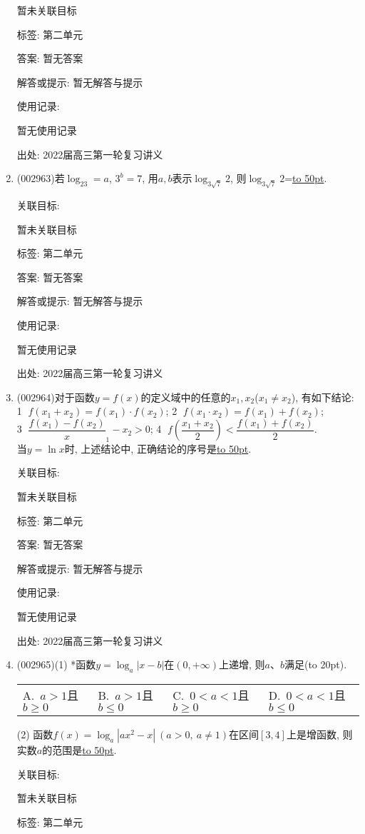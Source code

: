 \documentclass[10pt,a4paper]{article}
\newcommand{\blank}[1]{\underline{\hbox to #1pt{}}}
\newcommand{\bracket}[1]{(\hbox to #1pt{})}
\newcommand{\fourch}[4]{\par\begin{tabular}{p{.23\textwidth}p{.23\textwidth}p{.23\textwidth}p{.23\textwidth}}
A.~#1 &B.~#2& C.~#3& D.~#4
\end{tabular}}
\begin{document}
\begin{enumerate}[1.]
暂未关联目标



标签: 第二单元

答案: 暂无答案

解答或提示: 暂无解答与提示

使用记录:

暂无使用记录


出处: 2022届高三第一轮复习讲义
\item { (002963)}若$\log_23=a$, $3^b=7$, 用$a,b$表示$\log_{3\sqrt 7}2$, 则$\log_{3\sqrt 7}2$=\blank{50}.


关联目标:

暂未关联目标



标签: 第二单元

答案: 暂无答案

解答或提示: 暂无解答与提示

使用记录:

暂无使用记录


出处: 2022届高三第一轮复习讲义
\item { (002964)}对于函数$y=f(x)$的定义域中的任意的$x_1,x_2$($x_1\ne x_2$), 有如下结论:\\
\textcircled{1} $f(x_1+x_2)=f(x_1)\cdot f(x_2)$; \textcircled{2} $f(x_1\cdot x_2)=f(x_1)+f(x_2)$;\\ \textcircled{3} $\dfrac{f(x_1)-f(x_2)}x_1-x_2>0$; \textcircled{4} $f(\dfrac{x_1+x_2}2)<\dfrac{f(x_1)+f(x_2)}2$. 
\\当$y=\ln x$时, 上述结论中, 正确结论的序号是\blank{50}.


关联目标:

暂未关联目标



标签: 第二单元

答案: 暂无答案

解答或提示: 暂无解答与提示

使用记录:

暂无使用记录


出处: 2022届高三第一轮复习讲义
\item { (002965)}(1) *函数$y=\log_a|x-b|$在$(0,+\infty)$上递增, 则$a$、$b$满足\bracket{20}.
\fourch{$a>1$且$b\ge 0$}{$a>1$且$b\le 0$}{$0<a<1$且$b\ge 0$}{$0<a<1$且$b\le 0$}
(2) 函数$f(x)=\log_a|ax^2-x| \ (a>0,\ a\ne 1)$在区间$[3,4]$上是增函数, 则实数$a$的范围是\blank{50}.


关联目标:

暂未关联目标



标签: 第二单元


\end{enumerate}
\end{document}
